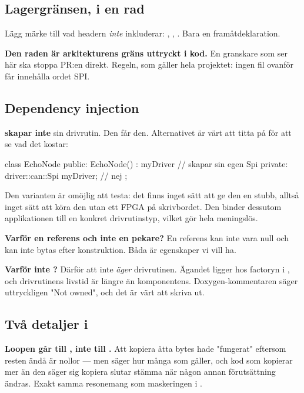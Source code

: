 \subsection{Lagergränsen, i en rad}

Lägg märke till vad headern \emph{inte} inkluderar: , ,
. Bara en framåtdeklaration.

\textbf{Den raden är arkitekturens gräns uttryckt i kod.} En granskare som ser
 här ska stoppa PR:en direkt. Regeln, som gäller hela projektet:
ingen fil ovanför  får innehålla ordet SPI.

\subsection{Dependency injection}

 \textbf{skapar inte} sin drivrutin. Den får den. Alternativet är värt att titta på
för att se vad det kostar:

\begin{cppcode}
class EchoNode
{
public:
    EchoNode() : myDriver{} {}   // skapar sin egen Spi
private:
    driver::can::Spi myDriver;   // nej
};
\end{cppcode}

Den varianten är omöjlig att testa: det finns inget sätt att ge den en stubb, alltså inget sätt
att köra den utan ett FPGA på skrivbordet. Den binder dessutom applikationen till en konkret
drivrutinstyp, vilket gör hela  meningslös.

\textbf{Varför en referens och inte en pekare?} En referens kan inte vara null och kan inte bytas
efter konstruktion. Båda är egenskaper vi vill ha.

\textbf{Varför inte ?} Därför att  inte \emph{äger}
drivrutinen. Ägandet ligger hos factoryn i , och drivrutinens livstid är längre än
komponentens. Doxygen-kommentaren säger uttryckligen "Not owned", och det är värt att skriva ut.

\subsection{Två detaljer i \texorpdfstring{}{run()}}

\textbf{Loopen går till , inte till .} Att kopiera åtta bytes hade
"fungerat" eftersom resten ändå är nollor --- men  säger hur många som gäller,
och kod som kopierar mer än den säger sig kopiera slutar stämma när någon annan förutsättning
ändras. Exakt samma resonemang som maskeringen i .

